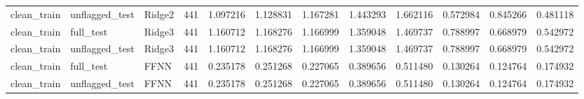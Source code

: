 \begin{tabular}{lllrrrrrrrrr}
clean_train & unflagged_test & Ridge2 & 441 & 1.097216 & 1.128831 & 1.167281 & 1.443293 & 1.662116 & 0.572984 & 0.845266 & 0.481118 \\
clean_train & full_test & Ridge3 & 441 & 1.160712 & 1.168276 & 1.166999 & 1.359048 & 1.469737 & 0.788997 & 0.668979 & 0.542972 \\
clean_train & unflagged_test & Ridge3 & 441 & 1.160712 & 1.168276 & 1.166999 & 1.359048 & 1.469737 & 0.788997 & 0.668979 & 0.542972 \\
clean_train & full_test & FFNN & 441 & 0.235178 & 0.251268 & 0.227065 & 0.389656 & 0.511480 & 0.130264 & 0.124764 & 0.174932 \\
clean_train & unflagged_test & FFNN & 441 & 0.235178 & 0.251268 & 0.227065 & 0.389656 & 0.511480 & 0.130264 & 0.124764 & 0.174932 \\
\bottomrule
\end{tabular}
